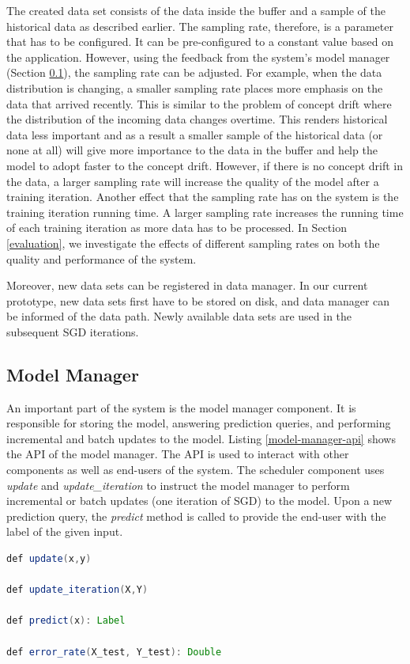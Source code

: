 \documentclass{vldb}
\begin{document}
The created data set consists of the data inside the buffer and a sample of the historical data as described earlier.
The sampling rate, therefore, is a parameter that has to be configured.
It can be pre-configured to a constant value based on the application.
However, using the feedback from the system's model manager (Section \ref{model-manager}), the sampling rate can be adjusted.
For example, when the data distribution is changing, a smaller sampling rate places more emphasis on the data that arrived recently. 
This is similar to the problem of concept drift where the distribution of the incoming data changes overtime.
This renders historical data less important and as a result a smaller sample of the historical data (or none at all) will give more importance to the data in the buffer and help the model to adopt faster to the concept drift.
However, if there is no concept drift in the data, a larger sampling rate will increase the quality of the model after a training iteration.
Another effect that the sampling rate has on the system is the training iteration running time.
A larger sampling rate increases the running time of each training iteration as more data has to be processed.
In Section \ref{evaluation}, we investigate the effects of different sampling rates on both the quality and performance of the system.

Moreover,  new data sets can be registered in data manager.
In our current prototype, new data sets first have to be stored on disk, and data manager can be informed of the data path.
Newly available data sets are used in the subsequent SGD iterations.

\subsection{Model Manager} \label{model-manager} 
An important part of the system is the model manager component.
It is responsible for storing the model, answering prediction queries, and performing incremental and batch updates to the model.
Listing \ref{model-manager-api} shows the API of the model manager.
The API is used to interact with other components as well as end-users of the system.
The scheduler component uses \textit{update} and \textit{update\_iteration} to instruct the model manager to perform incremental or batch updates (one iteration of SGD) to the model.
Upon a new prediction query, the \textit{predict} method is called to provide the end-user with the label of the given input.

\noindent\hspace{-0.1\linewidth}\begin{minipage}[t]{\linewidth}
\begin{lstlisting}[language=java, basicstyle=\small\ttfamily, frame=tb ,columns=fullflexible,
showstringspaces=false,label=model-manager-api,caption=Model Manager API, numberstyle=\tiny]
def update(x,y)

def update_iteration(X,Y)

def predict(x): Label

def error_rate(X_test, Y_test): Double

\end{lstlisting}
\end{minipage}
\end{document}
